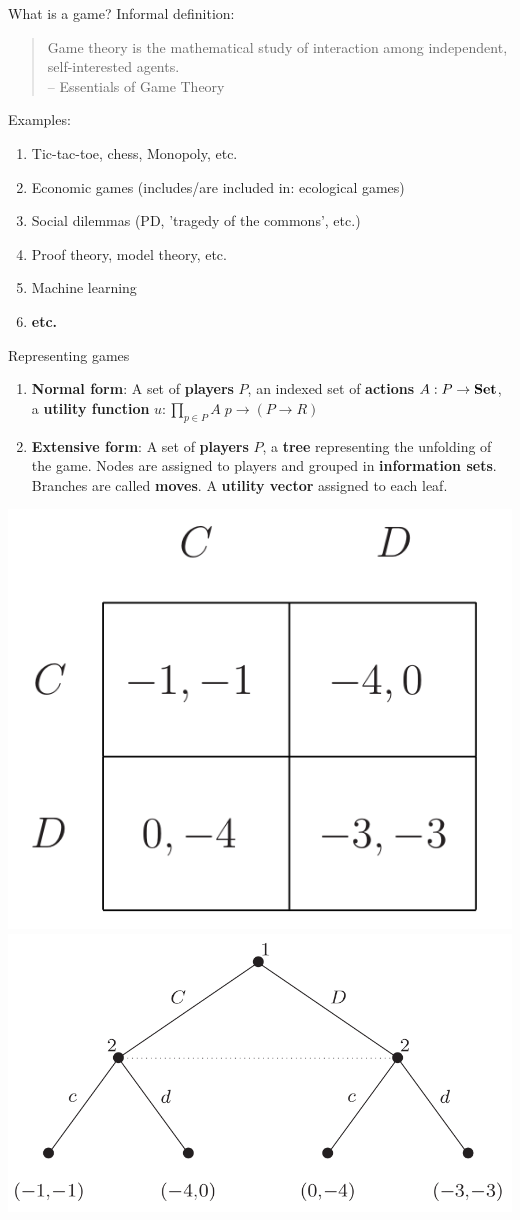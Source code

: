 \begin{frame}{What is a game?}
	Informal definition:

	\vfill
	\begin{quotation}
		Game theory is the mathematical study of interaction among independent, self-interested agents.\\
		{\color{colornote}-- Essentials of Game Theory \cite{leyton2008essentials}}
	\end{quotation}

	\vfill
	Examples:
	\begin{enumerate}
		\item Tic-tac-toe, chess, Monopoly, etc.
		\item Economic games (includes/are included in: ecological games)
		\item Social dilemmas (PD, 'tragedy of the commons', etc.)
		\item Proof theory, model theory, etc.
		\item Machine learning
		\item \textbf{etc.}
	\end{enumerate}
\end{frame}

\begin{frame}{Representing games}
	\vfill
	\begin{enumerate}
		\item \textbf{Normal form}:
		A set of \textbf{players} $P$, an indexed set of \textbf{actions} $A : P \to \mathbf{Set}$, a \textbf{utility function}
		$u : \prod_{p \in P} A\; p \to (P \to R)$

		\item \textbf{Extensive form}:
		A set of \textbf{players} $P$, a \textbf{tree} representing the unfolding of the game. Nodes are assigned to players and grouped in \textbf{information sets}. Branches are called \textbf{moves}. A \textbf{utility vector} assigned to each leaf.
	\end{enumerate}

	\vfill
	\begin{center}
		\includegraphics[width=.4\textwidth]{figures/pd_norm.png}
		\qquad
		\includegraphics[width=.5\textwidth]{figures/pd_ext.png}
	\end{center}
\end{frame}

